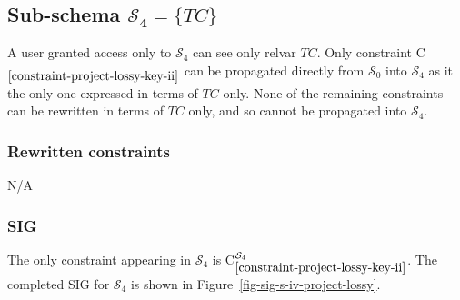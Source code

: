 \documentclass{article}
\newcounter{constraint}
\newcommand{\identifier}[1]{\ensuremath{\mathit{#1}}}
\newcommand{\TC}{\identifier{TC}}
\newcommand{\schema}[1]{\ensuremath{\mathcal{S}_{#1}}}
\newcommand{\Constraint}[2][]{C\ensuremath{_{#2}\ifx&#1&\else^{#1}\fi}}
\begin{document}




\subsection{Sub-schema \(\bm{\schema{4} = \{\TC\}}\)}

\noindent A user granted access only to \(\schema{4}\) can see only relvar \(\TC\). Only constraint \Constraint{\ref{constraint-project-lossy-key-ii}} can be propagated directly from \(\schema{0}\) into \(\schema{4}\) as it the only one expressed in terms of \(\TC\) only. None of the remaining constraints can be rewritten in terms of \(\TC\) only, and so cannot be propagated into \(\schema{4}\).




\subsubsection{Rewritten constraints}
\label{sec-constraints-s-iv-project-lossy}

N/A




\subsubsection{SIG}
\label{sec-sigs-s-iv-project-lossy}

\noindent The only constraint appearing in \(\schema{4}\) is \Constraint[\schema{4}]{\ref{constraint-project-lossy-key-ii}}. The completed SIG for \(\schema{4}\) is shown in Figure~\ref{fig-sig-s-iv-project-lossy}.

\end{document}
